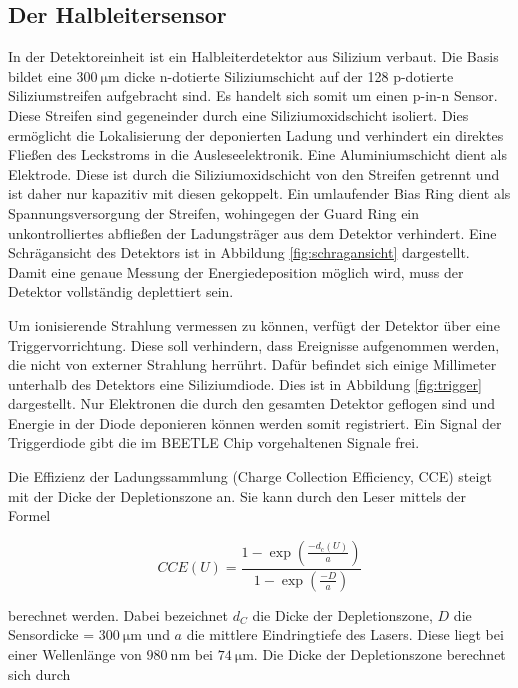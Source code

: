 \subsection{Der Halbleitersensor}

In der Detektoreinheit ist ein Halbleiterdetektor aus Silizium verbaut.
Die Basis bildet eine $\SI{300}{\micro\metre}$ dicke n-dotierte Siliziumschicht auf der 128 p-dotierte Siliziumstreifen aufgebracht sind.
Es handelt sich somit um einen p-in-n Sensor.
Diese Streifen sind gegeneinder durch eine Siliziumoxidschicht isoliert.
Dies ermöglicht die Lokalisierung der deponierten Ladung und verhindert ein direktes Fließen des Leckstroms in die Ausleseelektronik.
Eine Aluminiumschicht dient als Elektrode.
Diese ist durch die Siliziumoxidschicht von den Streifen getrennt und ist daher nur kapazitiv mit diesen gekoppelt.
Ein umlaufender Bias Ring dient als Spannungsversorgung der Streifen, wohingegen der Guard Ring ein unkontrolliertes abfließen der Ladungsträger aus dem Detektor verhindert.
Eine Schrägansicht des Detektors ist in Abbildung \ref{fig:schragansicht} dargestellt.
Damit eine genaue Messung der Energiedeposition möglich wird, muss der Detektor vollständig deplettiert sein.

Um ionisierende Strahlung vermessen zu können, verfügt der Detektor über eine Triggervorrichtung.
Diese soll verhindern, dass Ereignisse aufgenommen werden, die nicht von externer Strahlung herrührt.
Dafür befindet sich einige Millimeter unterhalb des Detektors eine Siliziumdiode.
Dies ist in Abbildung \ref{fig:trigger} dargestellt.
Nur Elektronen die durch den gesamten Detektor geflogen sind und Energie in der Diode deponieren können werden somit registriert.
Ein Signal der Triggerdiode gibt die im BEETLE Chip vorgehaltenen Signale frei.

Die Effizienz der Ladungssammlung (Charge Collection Efficiency, CCE) steigt mit der Dicke der Depletionszone an.
Sie kann durch den Leser mittels der Formel

\begin{equation}
  \label{eqn:Eindringtiefe}
  CCE(U) = \frac{1 - \exp(\frac{-d_c(U)}{a})}{1 - \exp(\frac{-D}{a})}
\end{equation}

berechnet werden.
Dabei bezeichnet $d_C$ die Dicke der Depletionszone, $D$ die Sensordicke = $\SI{300}{\micro\metre}$ und $a$ die mittlere Eindringtiefe des Lasers.
Diese liegt bei einer Wellenlänge von $\SI{980}{\nano\metre}$ bei $\SI{74}{\micro\metre}$.
Die Dicke der Depletionszone berechnet sich durch

